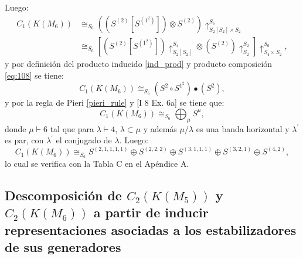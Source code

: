 \documentclass[12pt]{book}
\theoremstyle{definition}
\newcounter{in}
\newcounter{ini}
\begin{document}
Luego:
\begin{equation}
\begin{aligned}
C_{1}(K(M_{6})) & \cong_{S_{6}} ((S^{(2)} \left [ S^{(1^{2})} \right ]) \otimes S^{(2)}) \uparrow_{S_{2} \left [ S_{2} \right ] \times S_{2}}^{S_{6}} \\
& \cong_{S_{6}} \left [ (S^{(2)} \left [ S^{(1^{2})} \right ]) \uparrow_{S_{2} \left [ S_{2} \right ]}^{S_{4}} \otimes (S^{(2)}) \uparrow_{S_{2}}^{S_{2}} \right ] \uparrow_{S_{4} \times S_{2}}^{S_{6}},
\end{aligned}
\end{equation}
y por definición del producto inducido \ref{ind_prod} y producto composición \ref{eq:108} se tiene:
\begin{equation}
C_{1}(K(M_{6})) \cong_{S_{6}} (S^{2}  \circ S^{1^{2}}) \bullet (S^{2}), 
\end{equation}
y por la regla de Pieri \ref{pieri_rule} y \cite{macdonald1998symmetric} [I 8 Ex. 6a] se tiene que:
\begin{equation}
C_{1}(K(M_{6})) \cong_{S_{6}} \bigoplus_{\mu} S^{\mu},
\end{equation}
donde $\mu \vdash 6$ tal que para $\lambda \vdash 4$, $\lambda \subset \mu$ y además $\mu / \lambda$ es una banda horizontal y $\lambda^{'}$ es par, con $\lambda^{'}$ el conjugado de $\lambda$. Luego:
\begin{equation}
C_{1}(K(M_{6})) \cong_{S_{6}}  S^{(2,1,1,1,1)} \oplus S^{(2,2,2)} \oplus S^{(3,1,1,1)} \oplus S^{(3,2,1)} \oplus S^{(4,2)},
\end{equation}
lo cual se verifica con la Tabla C en el Apéndice A.

\subsection{Descomposición de $C_{2}(K(M_5))$ y $C_{2}(K(M_6))$ a partir de inducir representaciones asociadas a los estabilizadores de sus generadores}
\label{Ind_est_o_2}
\end{document}
